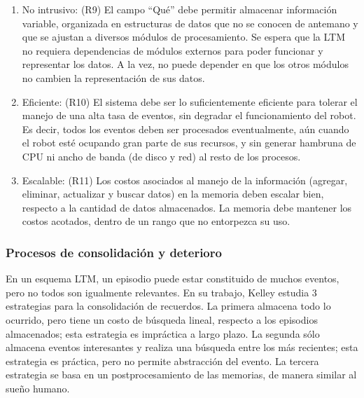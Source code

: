 \begin{enumerate}[topsep=0pt]
\setlength\itemsep{0.2em}
\item No intrusivo: (R9) El campo ``Qué'' debe permitir almacenar información variable, organizada en estructuras de datos que no se conocen de antemano y que se ajustan a diversos módulos de procesamiento. Se espera que la LTM no requiera dependencias de módulos externos para poder funcionar y representar los datos. A la vez, no puede depender en que los otros módulos no cambien la representación de sus datos.

\item Eficiente: (R10) El sistema debe ser lo suficientemente eficiente para tolerar el manejo de una alta tasa de eventos, sin degradar el funcionamiento del robot. Es decir, todos los eventos deben ser procesados eventualmente, aún cuando el robot esté ocupando gran parte de sus recursos, y sin generar hambruna de CPU ni ancho de banda (de disco y red) al resto de los procesos.

\item Escalable: (R11) Los costos asociados al manejo de la información (agregar, eliminar, actualizar y buscar datos) en la memoria deben escalar bien, respecto a la cantidad de datos almacenados. La memoria debe mantener los costos acotados, dentro de un rango que no entorpezca su uso.

\end{enumerate}



\subsubsection{Procesos de consolidación y deterioro}
%

En un esquema LTM, un episodio puede estar constituido de muchos eventos, pero no todos son igualmente relevantes. En su trabajo, Kelley \cite{Kelley2014} estudia 3 estrategias para la consolidación de recuerdos. La primera almacena todo lo ocurrido, pero tiene un costo de búsqueda lineal, respecto a los episodios almacenados; esta estrategia es impráctica a largo plazo. La segunda sólo almacena eventos interesantes y realiza una búsqueda entre los más recientes; esta estrategia es práctica, pero no permite abstracción del evento. La tercera estrategia se basa en un postprocesamiento de las memorias, de manera similar al sue\~no humano.

